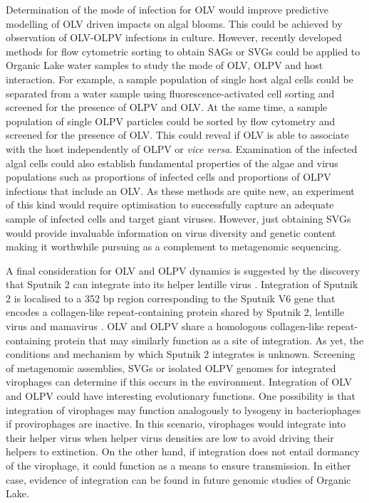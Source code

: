 Determination of the mode of infection for \ac{OLV} would improve predictive modelling of \ac{OLV} driven impacts on algal blooms.
This could be achieved by observation of \ac{OLV}-\ac{OLPV} infections in culture.
However, recently developed methods for flow cytometric sorting to obtain \acp{SAG} or \acp{SVG} \cite{Martinez-Martinez2011, Allen2011} could be applied to Organic Lake water samples to study the mode of \ac{OLV}, \ac{OLPV} and host interaction.
For example, a sample population of single host algal cells could be separated from a water sample using fluorescence-activated cell sorting and screened for the presence of \ac{OLPV} and \ac{OLV}.
At the same time, a sample population of single \ac{OLPV} particles could be sorted by flow cytometry and screened for the presence of \ac{OLV}.
This could reveal if \ac{OLV} is able to associate with the host independently of \ac{OLPV} or \emph{vice versa}.
Examination of the infected algal cells could also establish fundamental properties of the algae and virus populations such as proportions of infected cells and proportions of \ac{OLPV} infections that include an \ac{OLV}.
As these methods are quite new, an experiment of this kind would require optimisation to successfully capture an adequate sample of infected cells and target giant viruses.
However, just obtaining \acp{SVG} would provide invaluable information on virus diversity and genetic content making it worthwhile pursuing as a complement to metagenomic sequencing.

A final consideration for \ac{OLV} and \ac{OLPV} dynamics is suggested by the discovery that Sputnik 2 can integrate into its helper lentille virus \cite{Desnues2012}.
Integration of Sputnik 2 is localised to a 352 bp region corresponding to the Sputnik V6 gene that encodes a collagen-like repeat-containing protein shared by Sputnik 2, lentille virus and mamavirus  \cite{Desnues2012}. 
\ac{OLV} and \ac{OLPV} share a homologous collagen-like repeat-containing protein that may similarly function as a site of integration.
As yet, the conditions and mechanism by which Sputnik 2 integrates is unknown.
Screening of metagenomic assemblies, \acp{SVG} or isolated \ac{OLPV} genomes for integrated virophages can determine if this occurs in the environment.
Integration of \ac{OLV} and \ac{OLPV} could have interesting evolutionary functions.
One possibility is that integration of virophages may function analogously to lysogeny in bacteriophages if provirophages are inactive.
In this scenario, virophages would integrate into their helper virus when helper virus densities are low to avoid driving their helpers to extinction.
On the other hand, if integration does not entail dormancy of the virophage, it could function as a means to ensure transmission.
In either case, evidence of integration can be found in future genomic studies of Organic Lake.

